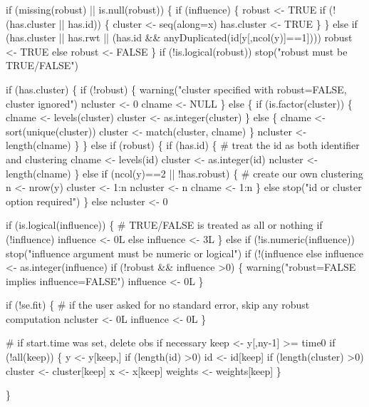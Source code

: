 \documentclass{article}
\begin{document}
\begin{nwchunk}
     if (missing(robust) || is.null(robust)) \{
         if (influence) \{
             robust <- TRUE
             if (!(has.cluster || has.id)) \{
                 cluster <- seq(along=x)
                 has.cluster <- TRUE
             \}
         \}
         else if (has.cluster || has.rwt ||
                  (has.id && anyDuplicated(id[y[,ncol(y)]==1])))
             robust <- TRUE 
         else robust <- FALSE
     \}
     if (!is.logical(robust)) stop("robust must be TRUE/FALSE")
 
     if (has.cluster) \{
         if (!robust) \{
             warning("cluster specified with robust=FALSE, cluster ignored")
             ncluster <- 0
             clname <- NULL
         \}
         else \{
             if (is.factor(cluster)) \{
                 clname <- levels(cluster)
                 cluster <- as.integer(cluster)
             \} else \{
                 clname  <- sort(unique(cluster))
                 cluster <- match(cluster, clname)
             \}
             ncluster <- length(clname)
         \}
     \} else if (robust) \{
         if (has.id) \{
             # treat the id as both identifier and clustering
             clname <- levels(id)
             cluster <- as.integer(id)
             ncluster <- length(clname)
         \}
         else if (ncol(y)==2 || !has.robust) \{
             # create our own clustering
             n <- nrow(y)
             cluster <- 1:n
             ncluster <- n
             clname <- 1:n
         \}   
         else stop("id or cluster option required")
     \} else ncluster <- 0
  
     if (is.logical(influence)) \{
         # TRUE/FALSE is treated as all or nothing
         if (!influence) influence <- 0L
         else influence <- 3L
     \}
     else if (!is.numeric(influence))
         stop("influence argument must be numeric or logical")
     if (!(influence %
     else influence <- as.integer(influence)
     if (!robust && influence >0) \{
         warning("robust=FALSE implies influence=FALSE")
         influence <- 0L
     \}       
   
     if (!se.fit) \{
         # if the user asked for no standard error, skip any robust computation
         ncluster <- 0L
         influence <- 0L
     \}
 
     # if start.time was set, delete obs if necessary
     keep <- y[,ny-1] >= time0
     if (!all(keep)) \{
         y <- y[keep,]
         if (length(id) >0) id <- id[keep]
         if (length(cluster) >0) cluster <- cluster[keep]
         x <- x[keep]
         weights <- weights[keep]
     \}
 
 
 \}
\end{nwchunk}
\end{document}
